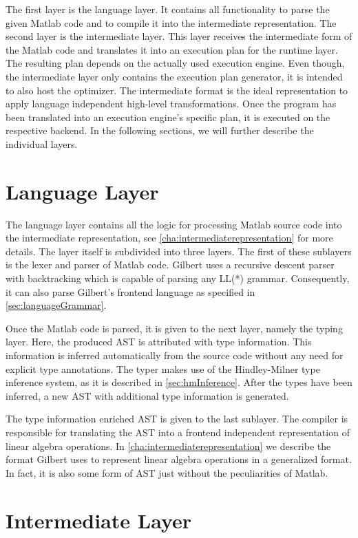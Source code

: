 The first layer is the language layer.
It contains all functionality to parse the given Matlab code and to compile it into the intermediate representation.
The second layer is the intermediate layer.
This layer receives the intermediate form of the Matlab code and translates it into an execution plan for the runtime layer.
The resulting plan depends on the actually used execution engine.
Even though, the intermediate layer only contains the execution plan generator, it is intended to also host the optimizer.
The intermediate format is the ideal representation to apply language independent high-level transformations.
Once the program has been translated into an execution engine's specific plan, it is executed on the respective backend.
In the following sections, we will further describe the individual layers.

\section{Language Layer}

The language layer contains all the logic for processing Matlab source code into the intermediate representation, see \cref{cha:intermediaterepresentation} for more details.
The layer itself is subdivided into three layers.
The first of these sublayers is the lexer and parser of Matlab code.
Gilbert uses a recursive descent parser with backtracking which is capable of parsing any LL(*) grammar.
Consequently, it can also parse Gilbert's frontend language as specified in \cref{sec:languageGrammar}.

Once the Matlab code is parsed, it is given to the next layer, namely the typing layer.
Here, the produced AST is attributed with type information.
This information is inferred automatically from the source code without any need for explicit type annotations.
The typer makes use of the Hindley-Milner type inference system, as it is described in \cref{sec:hmInference}.
After the types have been inferred, a new AST with additional type information is generated.

The type information enriched AST is given to the last sublayer.
The compiler is responsible for translating the AST into a frontend independent representation of linear algebra operations.
In \cref{cha:intermediaterepresentation} we describe the format Gilbert uses to represent linear algebra operations in a generalized format.
In fact, it is also some form of AST just without the peculiarities of Matlab.

\section{Intermediate Layer}

